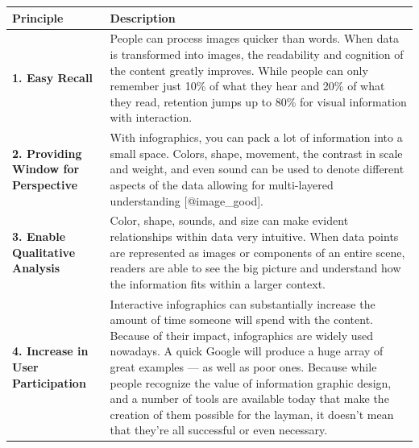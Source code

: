 \documentclass[]{book}
\theoremstyle{definition}
\theoremstyle{definition}
\theoremstyle{definition}
\theoremstyle{remark}
\begin{document}
\begin{longtable}[]{@{}ll@{}}
\toprule
\begin{minipage}[b]{0.16\columnwidth}\raggedright\strut
\textbf{Principle}\strut
\end{minipage} & \begin{minipage}[b]{0.78\columnwidth}\raggedright\strut
\textbf{Description}\strut
\end{minipage}\tabularnewline
\midrule
\endhead
\begin{minipage}[t]{0.16\columnwidth}\raggedright\strut
\textbf{1. Easy Recall}\strut
\end{minipage} & \begin{minipage}[t]{0.78\columnwidth}\raggedright\strut
People can process images quicker than words. When data is transformed
into images, the readability and cognition of the content greatly
improves. While people can only remember just 10\% of what they hear and
20\% of what they read, retention jumps up to 80\% for visual
information with interaction.\strut
\end{minipage}\tabularnewline
\begin{minipage}[t]{0.16\columnwidth}\raggedright\strut
\textbf{2. Providing Window for Perspective}\strut
\end{minipage} & \begin{minipage}[t]{0.78\columnwidth}\raggedright\strut
With infographics, you can pack a lot of information into a small space.
Colors, shape, movement, the contrast in scale and weight, and even
sound can be used to denote different aspects of the data allowing for
multi-layered understanding {[}@image\_good{]}.\strut
\end{minipage}\tabularnewline
\begin{minipage}[t]{0.16\columnwidth}\raggedright\strut
\textbf{3. Enable Qualitative Analysis}\strut
\end{minipage} & \begin{minipage}[t]{0.78\columnwidth}\raggedright\strut
Color, shape, sounds, and size can make evident relationships within
data very intuitive. When data points are represented as images or
components of an entire scene, readers are able to see the big picture
and understand how the information fits within a larger context.\strut
\end{minipage}\tabularnewline
\begin{minipage}[t]{0.16\columnwidth}\raggedright\strut
\textbf{4. Increase in User Participation}\strut
\end{minipage} & \begin{minipage}[t]{0.78\columnwidth}\raggedright\strut
Interactive infographics can substantially increase the amount of time
someone will spend with the content. Because of their impact,
infographics are widely used nowadays. A quick Google will produce a
huge array of great examples --- as well as poor ones. Because while
people recognize the value of information graphic design, and a number
of tools are available today that make the creation of them possible for
the layman, it doesn't mean that they're all successful or even
necessary.\strut
\end{minipage}\tabularnewline
\bottomrule
\end{longtable}
\end{document}
